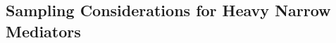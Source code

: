 
\subsection{Sampling Considerations for Heavy Narrow Mediators}
\label{thought:heavynarrowmediators}

